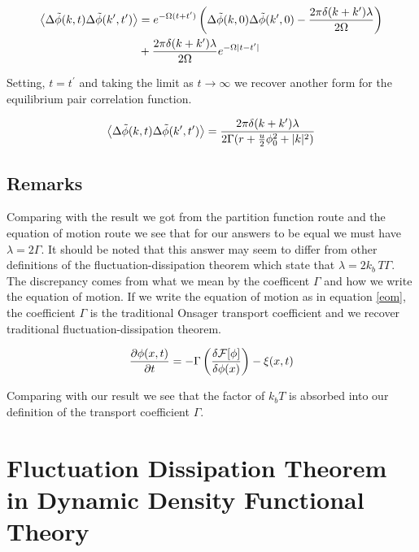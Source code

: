 \begin{align}
	\left\langle \Delta\tilde{\phi}(k, t) \Delta\tilde{\phi}(k^\prime, t^\prime)\right\rangle &=  e^{-\Omega(t+t^\prime)}\left(\Delta\tilde{\phi}(k, 0)\Delta\tilde{\phi}(k^\prime, 0) - \frac{2\pi\delta(k+k^\prime)\lambda}{2\Omega}\right) \nonumber \\
	&+ \frac{2\pi\delta(k+k^\prime)\lambda}{2\Omega}e^{-\Omega \vert t-t^\prime \vert}
\end{align}

Setting, $t = t^\prime$ and taking the limit as $t\rightarrow\infty$ we recover another form for the equilibrium pair correlation function.

\begin{equation}
	\left\langle \Delta\tilde{\phi}(k, t) \Delta\tilde{\phi}(k^\prime, t^\prime)\right\rangle = \frac{2\pi\delta(k+k^\prime)\lambda}{2\Gamma(r + \frac{u}{2}\phi_0^2 + \vert k\vert^2)}
\end{equation}

\subsection{Remarks}

Comparing with the result we got from the partition function route and the equation of motion route we see that for our answers to be equal we must have $\lambda = 2\Gamma$. It should be noted that this answer may seem to differ from other definitions of the fluctuation-dissipation theorem which state that $\lambda = 2k_b\,T\Gamma$. The discrepancy comes from what we mean by the coefficent $\Gamma$ and how we write the equation of motion. If we write the equation of motion as in equation \ref{eom}, the coefficient $\Gamma$ is the traditional Onsager transport coefficient and we recover traditional fluctuation-dissipation theorem.

\begin{equation}\label{eom}
	\frac{\partial \phi(x,t)}{\partial t} = -\Gamma \left(\frac{\delta \mathcal{F}[\phi]}{\delta \phi(x)}\right) - \xi(x,t)
\end{equation}

Comparing with our result we see that the factor of $k_bT$ is absorbed into our definition of the transport coefficient $\Gamma$.

\section{Fluctuation Dissipation Theorem in Dynamic Density Functional Theory}

